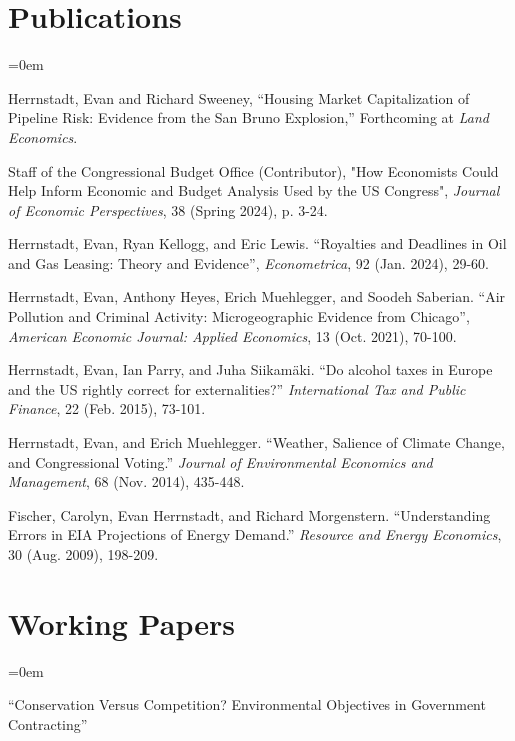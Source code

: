 \documentclass[letterpaper]{article}
\renewenvironment{itemize}{
  \vspace{-0.5em}
  \begin{list}{}{
	\itemsep=0em
    \setlength{\leftmargin}{1.5em}
  }
}{
  \end{list}
}
\begin{document}
\section*{Publications}

\begin{itemize}
\item Herrnstadt, Evan and Richard Sweeney, “Housing Market Capitalization of Pipeline Risk: Evidence from the San Bruno Explosion,” Forthcoming at \emph{Land Economics}.

\item Staff of the Congressional Budget Office (Contributor), "How Economists Could Help Inform Economic and Budget Analysis Used by the US Congress", 
\textit{Journal of Economic Perspectives}, 38 (Spring 2024), p. 3-24.
	
\item Herrnstadt, Evan, Ryan Kellogg, and Eric Lewis. “Royalties and Deadlines in Oil and Gas Leasing: Theory and Evidence”, \textit{Econometrica}, 92 (Jan. 2024), 29-60.

\item Herrnstadt, Evan, Anthony Heyes, Erich Muehlegger, and Soodeh Saberian. “Air Pollution and Criminal Activity: Microgeographic Evidence from Chicago”, \textit{American Economic Journal: Applied Economics}, 13 (Oct. 2021), 70-100.

\item Herrnstadt, Evan, Ian Parry, and Juha Siikamäki. “Do alcohol taxes in Europe and the US rightly correct for externalities?” \textit{International Tax and Public Finance}, 22 (Feb. 2015), 73-101.

\item Herrnstadt, Evan, and Erich Muehlegger.  “Weather, Salience of Climate Change, and Congressional Voting.” \textit{Journal of Environmental Economics and Management}, 68 (Nov. 2014), 435-448.

\item Fischer, Carolyn, Evan Herrnstadt, and Richard Morgenstern. “Understanding Errors in EIA Projections of Energy Demand.”  \textit{Resource and Energy Economics}, 30 (Aug. 2009), 198-209.
\end{itemize}

\section*{Working Papers}

\begin{itemize}
\item “Conservation Versus Competition? Environmental Objectives in Government Contracting” 

\end{itemize}
\end{document}
